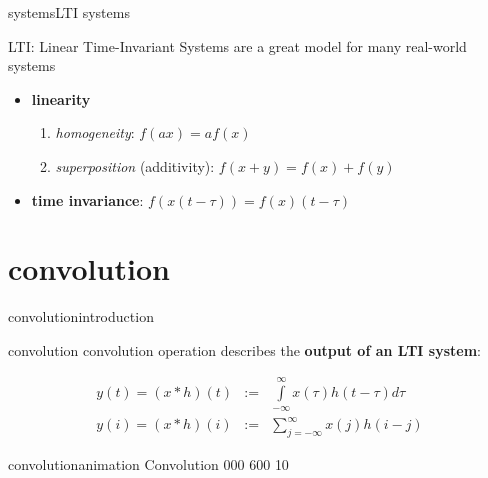         \begin{frame}{systems}{LTI systems}
            \begin{block}{LTI: Linear Time-Invariant Systems}
                are a great model for many real-world systems
            \end{block}
            
            \bigskip
            \begin{itemize}
                \item   \textbf{linearity}
                   \begin{enumerate}
                        \item   \textit{homogeneity}:
                            $f(ax) = a f(x)$
                        \smallskip
                        \item   \textit{superposition} (additivity):
                        $f(x+y) = f(x) + f(y)$
                    \end{enumerate}
                 \bigskip
                \item   \textbf{time invariance}:
                    $f\left(x(t-\tau)\right) = f(x)(t-\tau)$
             \end{itemize}
        \end{frame}
     
    \section[convolution]{convolution}
        \begin{frame}{convolution}{introduction}
                \begin{block}{convolution}
                    convolution operation describes the \textbf{output of an LTI system}:
                \end{block}
                
            \bigskip
            \begin{eqnarray*}
                y(t) = (x \ast h)(t) &:=& \int\limits_{-\infty}^{\infty}x(\tau)h(t-\tau)d\tau\\
                y(i) = (x \ast h)(i) &:=& \sum\limits_{j=-\infty}^{\infty}x(j)h(i-j)
            \end{eqnarray*}
        \end{frame}
            
        \begin{frame}{convolution}{animation}
            \vspace{-3mm}
                {Convolution}
                {000}
                {600}
                {10}
        \end{frame}

